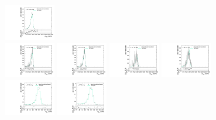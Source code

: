 \begin{figure}[htpb]
  \includegraphics[width=0.2\textwidth]{fig/analysisAppendix/templateVsReco_WprToWH2000_r0_MVV_mu_LP_nobb_HDy_linear.pdf}\\
  \includegraphics[width=0.2\textwidth]{fig/analysisAppendix/templateVsReco_WprToWH2000_r0_MVV_mu_HP_vbf_LDy_linear.pdf}
  \includegraphics[width=0.2\textwidth]{fig/analysisAppendix/templateVsReco_WprToWH2000_r0_MVV_mu_LP_vbf_LDy_linear.pdf}
  \includegraphics[width=0.2\textwidth]{fig/analysisAppendix/templateVsReco_WprToWH2000_r0_MVV_mu_HP_vbf_HDy_linear.pdf}
  \includegraphics[width=0.2\textwidth]{fig/analysisAppendix/templateVsReco_WprToWH2000_r0_MVV_mu_LP_vbf_HDy_linear.pdf}\\
  \includegraphics[width=0.2\textwidth]{fig/analysisAppendix/templateVsReco_WprToWH2000_r0_MJ_mu_HP_bb_LDy.pdf}
  \includegraphics[width=0.2\textwidth]{fig/analysisAppendix/templateVsReco_WprToWH2000_r0_MJ_mu_LP_bb_LDy.pdf}

\end{figure}
